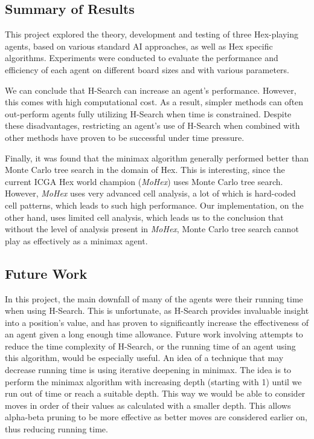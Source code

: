 \subsection{Summary of Results}

This project explored the theory, development and testing of three Hex-playing agents, based on various standard AI approaches, as well as Hex specific algorithms. Experiments were conducted to evaluate the performance and efficiency of each agent on different board sizes and with various parameters. 




We can conclude that H-Search can increase an agent's performance. However, this comes with high computational cost. As a result, simpler methods can often out-perform agents fully utilizing H-Search when time is constrained. Despite these disadvantages, restricting an agent's use of H-Search when combined with other methods have proven to be successful under time pressure.




Finally, it was found that the minimax algorithm generally performed better than Monte Carlo tree search in the domain of Hex. This is interesting, since the current ICGA Hex world champion (\textit{MoHex}) uses Monte Carlo tree search. However, \textit{MoHex} uses very advanced cell analysis, a lot of which is hard-coded cell patterns, which leads to such high performance. Our implementation, on the other hand, uses limited cell analysis, which leads us to the conclusion that without the level of analysis present in \textit{MoHex}, Monte Carlo tree search cannot play as effectively as a minimax agent.



\subsection{Future Work}

In this project, the main downfall of many of the agents were their running time when using H-Search. This is unfortunate, as H-Search provides invaluable insight into a position's value, and has proven to significantly increase the effectiveness of an agent given a long enough time allowance. Future work involving attempts to reduce the time complexity of H-Search, or the running time of an agent using this algorithm, would be especially useful. An idea of a technique that may decrease running time is using iterative deepening in minimax. The idea is to perform the minimax algorithm with increasing depth (starting with 1) until we run out of time or reach a suitable depth. This way we would be able to consider moves in order of their values as calculated with a smaller depth. This allows alpha-beta pruning to be more effective as better moves are considered earlier on, thus reducing running time.

